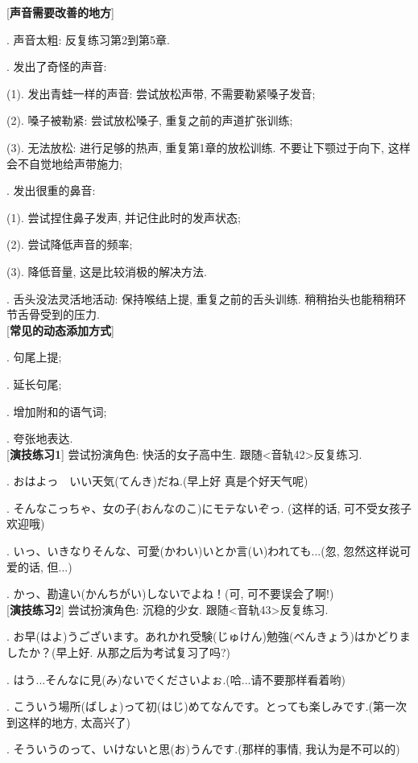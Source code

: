 [\textbf{声音需要改善的地方}]\par
{}. 声音太粗: 反复练习第2到第5章.\par
{}. 发出了奇怪的声音:\par
\qquad \qquad (1). 发出青蛙一样的声音: 尝试放松声带, 不需要勒紧嗓子发音;\par
\qquad \qquad (2). 嗓子被勒紧: 尝试放松嗓子, 重复之前的声道扩张训练;\par
\qquad \qquad (3). 无法放松: 进行足够的热声, 重复第1章的放松训练. 不要让下颚过于向下, 这样会不自觉地给声带施力;\par

\clearpage

. 发出很重的鼻音:\par
\qquad \qquad (1). 尝试捏住鼻子发声, 并记住此时的发声状态;\par
\qquad \qquad (2). 尝试降低声音的频率;\par
\qquad \qquad (3). 降低音量, 这是比较消极的解决方法.\par
{}. 舌头没法灵活地活动: 保持喉结上提, 重复之前的舌头训练. 稍稍抬头也能稍稍环节舌骨受到的压力.\\

[\textbf{常见的动态添加方式}]\par
{}. 句尾上提;\par
{}. 延长句尾;\par
{}. 增加附和的语气词;\par
{}. 夸张地表达.\\

[\textbf{演技练习1}] 尝试扮演角色: 快活的女子高中生. 跟随<音轨42>反复练习.\par
{}. \mincho おはよっ　いい天気(てんき)だね.\rmfamily (早上好 真是个好天气呢)\par
{}. \mincho そんなこっちゃ、女の子(おんなのこ)にモテないぞっ. \rmfamily (这样的话, 可不受女孩子欢迎哦)\par
{}. \mincho いっ、いきなりそんな、可愛(かわい)いとか言(い)われても...\rmfamily (忽, 忽然这样说可爱的话, 但...)\par
{}. \mincho かっ、勘違い(かんちがい)しないでよね！\rmfamily (可, 可不要误会了啊!)\\

[\textbf{演技练习2}] 尝试扮演角色: 沉稳的少女. 跟随<音轨43>反复练习.\par
{}. \mincho お早(はよ)うございます。あれかれ受験(じゅけん)勉強(べんきょう)はかどりましたか？\rmfamily (早上好. 从那之后为考试复习了吗?)\par
{}. \mincho はう...そんなに見(み)ないでくださいよぉ.\rmfamily (哈...请不要那样看着哟)\par
{}. \mincho こういう場所(ばしょ)って初(はじ)めてなんです。とっても楽しみです.\rmfamily (第一次到这样的地方, 太高兴了)\par
{}. \mincho そういうのって、いけないと思(お)うんです.\rmfamily (那样的事情, 我认为是不可以的)\\

